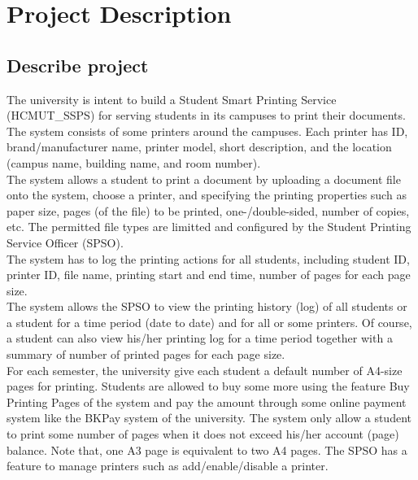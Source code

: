 \section{Project Description}

\subsection{Describe project}

The university is intent to build a Student Smart Printing Service (HCMUT\_SSPS) for serving
students in its campuses to print their documents.\\

The system consists of some printers around the campuses. Each printer has ID,
brand/manufacturer name, printer model, short description, and the location (campus name,
building name, and room number).\\

The system allows a student to print a document by uploading a document file onto the system,
choose a printer, and specifying the printing properties such as paper size, pages (of the file) to be printed, one-/double-sided, number of copies, etc. The permitted file types are limitted and configured by the Student Printing Service Officer (SPSO). \\

The system has to log the printing actions for all students, including student ID, printer ID, file
name, printing start and end time, number of pages for each page size. \\

The system allows the SPSO to view the printing history (log) of all students or a student for a
time period (date to date) and for all or some printers. Of course, a student can also view his/her
printing log for a time period together with a summary of number of printed pages for each
page size. \\

For each semester, the university give each student a default number of A4-size pages for
printing. Students are allowed to buy some more using the feature Buy Printing Pages of the
system and pay the amount through some online payment system like the BKPay system of the
university. The system only allow a student to print some number of pages when it does not
exceed his/her account (page) balance. Note that, one A3 page is equivalent to two A4 pages.
The SPSO has a feature to manage printers such as add/enable/disable a printer.\\

